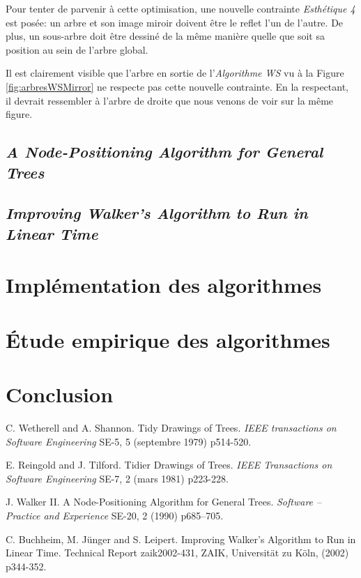 \documentclass{article}
\begin{document}
  Pour tenter de parvenir à cette optimisation, une nouvelle contrainte \emph{Esthétique 4} est posée: un arbre et son image miroir doivent être le reflet l'un de l'autre. De plus, un sous-arbre doit être dessiné de la même manière quelle que soit sa position au sein de l'arbre global.

  Il est clairement visible que l'arbre en sortie de l'\emph{Algorithme WS} vu à la Figure \ref{fig:arbresWSMirror} ne respecte pas cette nouvelle contrainte. En la respectant, il devrait ressembler à l'arbre de droite que nous venons de voir sur la même figure.
   




  \subsection{\emph{A Node-Positioning Algorithm for General Trees}}
  \subsection{\emph{Improving Walker’s Algorithm to Run in Linear Time}}


\newpage
\section{Implémentation des algorithmes}

\newpage
\section{Étude empirique des algorithmes}

\newpage
\section{Conclusion}




\newpage
\medskip

\begin{thebibliography}{10}

C. Wetherell and A. Shannon. Tidy Drawings of Trees. \textit{IEEE transactions on Software Engineering} SE-5, 5 (septembre 1979) p514-520.

E. Reingold and J. Tilford. Tidier Drawings of Trees. \textit{IEEE Transactions on Software Engineering} SE-7, 2 (mars 1981) p223-228.

J. Walker II. A Node-Positioning Algorithm for General Trees. \textit{Software – Practice and Experience} SE-20, 2 (1990) p685–705.

C. Buchheim, M. Jünger and S. Leipert. Improving Walker’s Algorithm to Run in Linear Time. Technical Report zaik2002-431, ZAIK, Universität zu Köln, (2002) p344-352.

\end{thebibliography}
\end{document}
